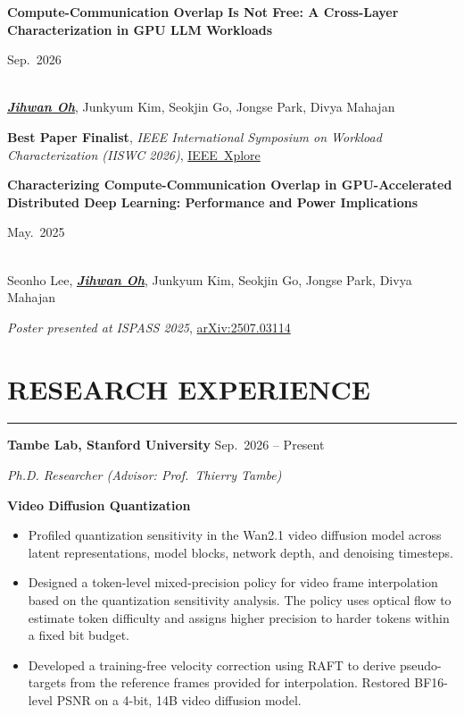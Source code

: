 \documentclass[11pt, a4paper]{article}
\newcommand{\resumesection}[1]{
    \vspace{-0.35cm}
    \section*{#1}
    \vspace{-0.25cm}
    \hrule\vspace{0.2cm}
}
\begin{document}
\noindent
\begin{minipage}[t]{0.85\textwidth}
\textbf{Compute-Communication Overlap Is Not Free: A Cross-Layer\\
Characterization in GPU LLM Workloads}
\end{minipage}%
\begin{minipage}[t]{0.15\textwidth}
\raggedleft Sep.\ 2026
\end{minipage}\\[-0.3em]

{\smaller[0.6]
\underline{\textbf{\textit{Jihwan Oh}}},
Junkyum Kim, Seokjin Go, Jongse Park, Divya Mahajan
}

{\smaller[0.6]
\textbf{Best Paper Finalist}, \textit{IEEE International Symposium on Workload Characterization (IISWC 2026)},
\href{https://doi.org/10.1109/IISWC71020.2026.00019}{IEEE~Xplore}
}

\vspace{0.1cm}


\noindent
\parbox[t]{0.88\textwidth}{%
\textbf{Characterizing Compute-Communication Overlap in GPU-Accelerated\\
Distributed Deep Learning: Performance and Power Implications}
}%
\hfill
\parbox[t]{0.10\textwidth}{%
\raggedleft May.\ 2025
}\\[-0.3em]

{\smaller[0.6]
Seonho Lee,
\underline{\textbf{\textit{Jihwan Oh}}},
Junkyum Kim, Seokjin Go, Jongse Park, Divya Mahajan
}

{\smaller[0.6]
\textit{Poster presented at ISPASS 2025},
\href{https://arxiv.org/abs/2507.03114}{arXiv:2507.03114}
}


\resumesection{RESEARCH EXPERIENCE}

\textbf{Tambe Lab, Stanford University}
\hfill Sep.\ 2026 -- Present

\begin{description}[wide=0pt]
    \item \textit{Ph.D. Researcher (Advisor: Prof.\ Thierry Tambe)}
\end{description}

\hspace*{0.6em}\textbf{Video Diffusion Quantization}\par\nopagebreak

\begin{itemize}[leftmargin=2em]
    \item Profiled quantization sensitivity in the Wan2.1 video diffusion model across latent representations, model blocks, network depth, and denoising timesteps.
    \item Designed a token-level mixed-precision policy for video frame interpolation based on the quantization sensitivity analysis. The policy uses optical flow to estimate token difficulty and assigns higher precision to harder tokens within a fixed bit budget.
    \item Developed a training-free velocity correction using RAFT to derive pseudo-targets from the reference frames provided for interpolation. Restored BF16-level PSNR on a 4-bit, 14B video diffusion model.
\end{itemize}
\end{document}
